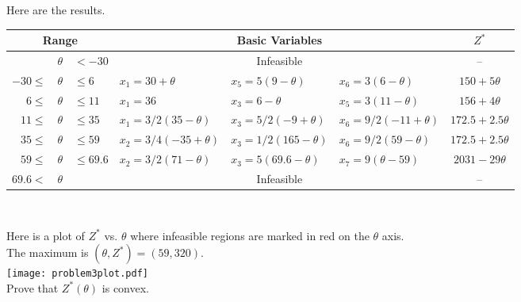 Here are the results.
\begin{center}
\begin{tabular}{rcl|lll|c}
\multicolumn{3}{c|}{Range} & \multicolumn{3}{|c|}{Basic Variables} & $Z^*$\\
\hline
&$ \theta$&$<-30$ & \multicolumn{3}{c|}{Infeasible} & -- \\
$-30\leq$ &$\theta$& $\leq 6$ & $x_1 = 30 + \theta$ & $x_5 = 5(9 - \theta)$& $x_6 = 3(6- \theta)$ & $150 + 5\theta$\\
$6 \leq$ &$\theta$& $\leq 11$ & $x_1 = 36$ & $x_3 = 6 - \theta$ & $x_5 = 3(11- \theta)$ & $156 + 4\theta$\\
$11\leq $ &$\theta$& $ \leq 35$ & $x_1 = 3/2(35 - \theta)$ & $x_3 = 5/2(-9 + \theta) $ & $x_6 = 9/2(-11 + \theta)$ & $172.5 + 2.5 \theta$\\
$35 \leq $ &$\theta$& $ \leq 59$& $x_2 = 3/4(-35 + \theta)$& $x_3 = 1/2(165 - \theta)$& $x_6 = 9/2(59-\theta)$& $172.5 + 2.5 \theta$\\
$59 \leq $ &$\theta$& $ \leq 69.6$& $x_2 = 3/2(71 - \theta)$& $x_3 = 5(69.6 - \theta)$ & $x_7 = 9(\theta - 59)$&$2031-29\theta$\\
$69.6 < $&$\theta$& & \multicolumn{3}{c|}{Infeasible} & -- 
\end{tabular}\\
\end{center}
Here is a plot of $Z^*$ vs. $\theta$ where infeasible regions are marked in red on the $\theta$ axis.\\  The maximum is $(\theta, Z^*) = (59,320)$.\\
\texttt{[image: problem3plot.pdf]}\\
Prove that $Z^*(\theta)$ is convex.
